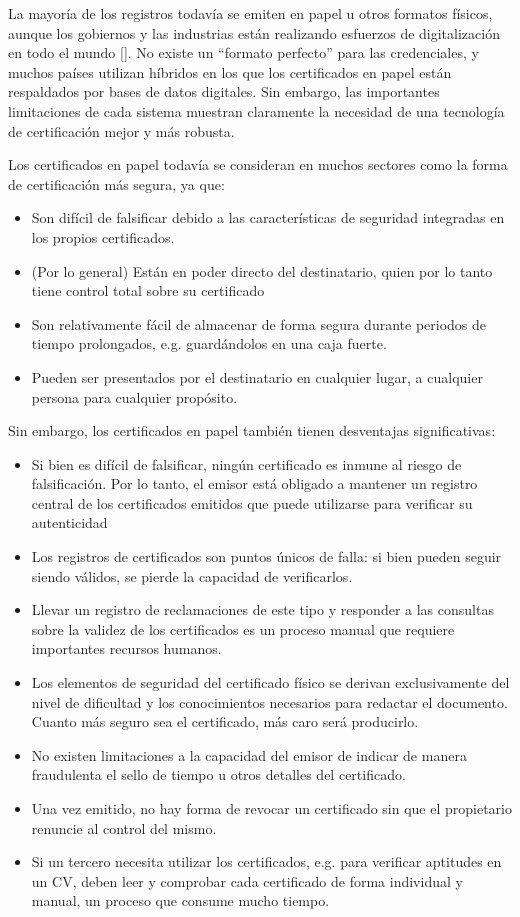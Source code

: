 La mayoría de los registros todavía se emiten en papel u otros formatos físicos, aunque los gobiernos y las industrias están realizando esfuerzos de digitalización en todo el mundo [\cite{cheng2017using}]. No existe un ``formato perfecto'' para las credenciales, y muchos países utilizan híbridos en los que los certificados en papel están respaldados por bases de datos digitales. Sin embargo, las importantes limitaciones de cada sistema muestran claramente la necesidad de una tecnología de certificación mejor y más robusta.

Los certificados en papel todavía se consideran en muchos sectores como la forma de certificación más segura, ya que:
\begin{itemize}
	\item Son difícil de falsificar debido a las características de seguridad integradas en los propios certificados.
	\item (Por lo general) Están en poder directo del destinatario, quien por lo tanto tiene control total sobre su certificado
	\item Son relativamente fácil de almacenar de forma segura durante periodos de tiempo prolongados, e.g. guardándolos en una caja fuerte.
	\item Pueden ser presentados por el destinatario en cualquier lugar, a cualquier persona para cualquier propósito.
\end{itemize}
Sin embargo, los certificados en papel también tienen desventajas significativas:
\begin{itemize}
	\item Si bien es difícil de falsificar, ningún certificado es inmune al riesgo de falsificación. Por lo tanto, el emisor está obligado a mantener un registro central de los certificados emitidos que puede utilizarse para verificar su autenticidad
	\item Los registros de certificados son puntos únicos de falla: si bien pueden seguir siendo válidos, se pierde la capacidad de verificarlos.
	\item Llevar un registro de reclamaciones de este tipo y responder a las consultas sobre la validez de los certificados es un proceso manual que requiere importantes recursos humanos.
	\item Los elementos de seguridad del certificado físico se derivan exclusivamente del nivel de dificultad y los conocimientos necesarios para redactar el documento. Cuanto más seguro sea el certificado, más caro será producirlo.
	\item No existen limitaciones a la capacidad del emisor de indicar de manera fraudulenta el sello de tiempo u otros detalles del certificado.
	\item Una vez emitido, no hay forma de revocar un certificado sin que el propietario renuncie al control del mismo.
	\item Si un tercero necesita utilizar los certificados, e.g. para verificar aptitudes en un CV, deben leer y comprobar cada certificado de forma individual y manual, un proceso que consume mucho tiempo.
\end{itemize}


